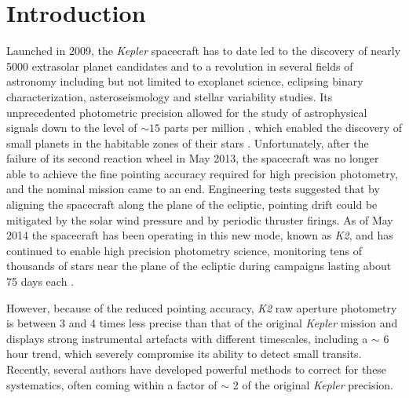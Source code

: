 \documentclass[]{emulateapj}
\begin{document}
\section{Introduction}
\label{sec:intro}
Launched in 2009, the \emph{Kepler} spacecraft has to date led to the discovery
of nearly 5000 extrasolar planet candidates
and to a revolution in several fields of astronomy including but not limited to
exoplanet science, eclipsing binary characterization, asteroseismology and stellar variability studies.
Its unprecedented photometric precision allowed for the study of astrophysical signals
down to the level of $\sim 15$ parts per million \citep{GIL11}, which enabled the discovery
of small planets in the habitable zones of their stars \citep[e.g.,][]{BOR13,QUI14,TOR15}.
Unfortunately, after the failure of its second reaction wheel in May 2013, the spacecraft was
no longer able to achieve the fine pointing accuracy required for high precision photometry,
and the nominal mission came to an end. Engineering tests suggested that by aligning
the spacecraft along the plane of the ecliptic, pointing drift could be mitigated
by the solar wind pressure and by periodic thruster firings. As of May 2014 the spacecraft has been operating in
this new mode, known as \emph{K2}, and has continued to enable high precision photometry
science, monitoring tens of thousands of stars near the plane of the ecliptic during campaigns 
lasting about 75 days each \citep{HOW14}.

However, because of the reduced pointing accuracy, \emph{K2} raw aperture photometry is between 
3 and 4 times less precise than that of the original \emph{Kepler} mission and displays
strong instrumental artefacts with different timescales, including a $\sim$ 6 hour trend, which
severely compromise its ability to detect small transits. Recently, several authors
have developed powerful methods to correct for these systematics, often coming within
a factor of $\sim$ 2 of the original \emph{Kepler} precision.
\end{document}
